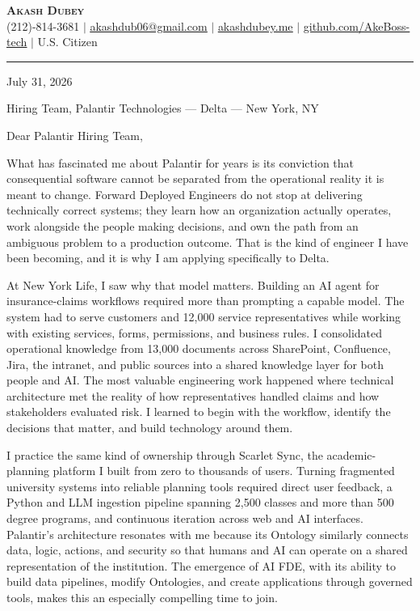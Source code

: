 \documentclass[letterpaper,11pt]{article}
\begin{document}
\begin{center}
    \textbf{\Huge \scshape Akash Dubey} \\ \vspace{2pt}
    \small (212)-814-3681 $|$ \href{mailto:akashdub06@gmail.com}{\underline{akashdub06@gmail.com}} $|$
    \href{https://akashdubey.me/}{\underline{akashdubey.me}} $|$
    \href{https://github.com/AkeBoss-tech}{\underline{github.com/AkeBoss-tech}} $|$
    \small U.S. Citizen
\end{center}
\vspace{4pt}
\hrule
\vspace{10pt}

July 31, 2026

\vspace{2pt}
Hiring Team, Palantir Technologies --- Delta --- New York, NY

\vspace{6pt}
Dear Palantir Hiring Team,

What has fascinated me about Palantir for years is its conviction that consequential software cannot be separated from the operational reality it is meant to change. Forward Deployed Engineers do not stop at delivering technically correct systems; they learn how an organization actually operates, work alongside the people making decisions, and own the path from an ambiguous problem to a production outcome. That is the kind of engineer I have been becoming, and it is why I am applying specifically to Delta.

At New York Life, I saw why that model matters. Building an AI agent for insurance-claims workflows required more than prompting a capable model. The system had to serve customers and 12,000 service representatives while working with existing services, forms, permissions, and business rules. I consolidated operational knowledge from 13,000 documents across SharePoint, Confluence, Jira, the intranet, and public sources into a shared knowledge layer for both people and AI. The most valuable engineering work happened where technical architecture met the reality of how representatives handled claims and how stakeholders evaluated risk. I learned to begin with the workflow, identify the decisions that matter, and build technology around them.

I practice the same kind of ownership through Scarlet Sync, the academic-planning platform I built from zero to thousands of users. Turning fragmented university systems into reliable planning tools required direct user feedback, a Python and LLM ingestion pipeline spanning 2,500 classes and more than 500 degree programs, and continuous iteration across web and AI interfaces. Palantir's architecture resonates with me because its Ontology similarly connects data, logic, actions, and security so that humans and AI can operate on a shared representation of the institution. The emergence of AI FDE, with its ability to build data pipelines, modify Ontologies, and create applications through governed tools, makes this an especially compelling time to join.
\end{document}
